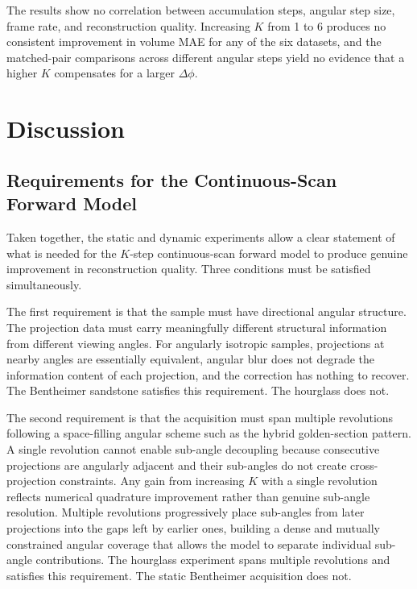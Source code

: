 \documentclass[12pt, a4paper, twoside]{report}
\begin{document}
The results show no correlation between accumulation steps, angular step size, frame rate, and reconstruction quality. Increasing $K$ from 1 to 6 produces no consistent improvement in volume MAE for any of the six datasets, and the matched-pair comparisons across different angular steps yield no evidence that a higher $K$ compensates for a larger $\Delta\phi$.


\section{Discussion}
\label{sec:cont_discussion}

\subsection{Requirements for the Continuous-Scan Forward Model}
\label{subsec:cont_disc_requirements}

Taken together, the static and dynamic experiments allow a clear statement of what is needed for the $K$-step continuous-scan forward model to produce genuine improvement in reconstruction quality. Three conditions must be satisfied simultaneously.

The first requirement is that the sample must have directional angular structure. The projection data must carry meaningfully different structural information from different viewing angles. For angularly isotropic samples, projections at nearby angles are essentially equivalent, angular blur does not degrade the information content of each projection, and the correction has nothing to recover. The Bentheimer sandstone satisfies this requirement. The hourglass does not.

The second requirement is that the acquisition must span multiple revolutions following a space-filling angular scheme such as the hybrid golden-section pattern. A single revolution cannot enable sub-angle decoupling because consecutive projections are angularly adjacent and their sub-angles do not create cross-projection constraints. Any gain from increasing $K$ with a single revolution reflects numerical quadrature improvement rather than genuine sub-angle resolution. Multiple revolutions progressively place sub-angles from later projections into the gaps left by earlier ones, building a dense and mutually constrained angular coverage that allows the model to separate individual sub-angle contributions. The hourglass experiment spans multiple revolutions and satisfies this requirement. The static Bentheimer acquisition does not.
\end{document}
